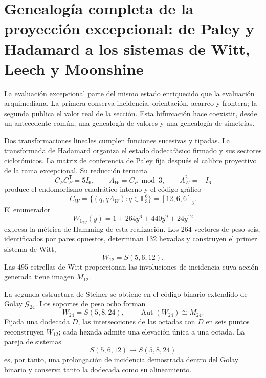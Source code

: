 \section{Genealogía completa de la proyección excepcional: de Paley y
Hadamard a los sistemas de Witt, Leech y Moonshine}
\label{sec:genealogia-excepcional-completa-autonoma}

La evaluación excepcional parte del mismo estado enriquecido que la
evaluación arquimediana. La primera conserva incidencia, orientación,
acarreo y frontera; la segunda publica el valor real de la sección. Esta
bifurcación hace coexistir, desde un antecedente común, una genealogía de
valores y una genealogía de simetrías.

Dos transformaciones lineales cumplen funciones sucesivas y tipadas. La
transformada de Hadamard organiza el estado dodecafásico firmado y sus
sectores ciclotómicos. La matriz de conferencia de Paley fija después el
calibre proyectivo de la rama excepcional. Su reducción ternaria
\[
 C_P C_P^{\mathsf T}=5I_6,
 \qquad
 A_W=C_P\bmod3,
 \qquad
 A_W^2=-I_6
\]
produce el endomorfismo cuadrático interno y el código gráfico
\[
 C_W=\{(q,qA_W):q\in\mathbb F_3^6\}
      =[12,6,6]_3.
\]
El enumerador
\[
 W_{C_W}(y)=1+264y^6+440y^9+24y^{12}
\]
expresa la métrica de Hamming de esta realización. Los 264 vectores de peso
seis, identificados por pares opuestos, determinan 132 hexadas y construyen
el primer sistema de Witt,
\[
 W_{12}=S(5,6,12).
\]
Las 495 estrellas de Witt proporcionan las involuciones de incidencia cuya
acción generada tiene imagen \(M_{12}\).

La segunda estructura de Steiner se obtiene en el código binario extendido
de Golay \(\mathcal G_{24}\). Los soportes de peso ocho forman
\[
 W_{24}=S(5,8,24),
 \qquad \operatorname{Aut}(W_{24})\cong M_{24}.
\]
Fijada una dodecada \(D\), las intersecciones de las octadas con \(D\) en
seis puntos reconstruyen \(W_{12}\); cada hexada admite una elevación única
a una octada. La pareja de sistemas
\[
 S(5,6,12)\longrightarrow S(5,8,24)
\]
es, por tanto, una prolongación de incidencia demostrada dentro del Golay
binario y conserva tanto la dodecada como su alineamiento.

